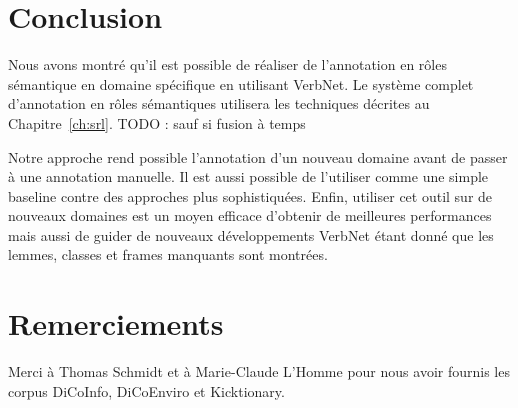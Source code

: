 \section{Conclusion}

Nous avons montré qu'il est possible de réaliser de l'annotation en rôles
sémantique en domaine spécifique en utilisant VerbNet. Le système complet
d'annotation en rôles sémantiques utilisera les techniques décrites au
Chapitre~\ref{ch:srl}. TODO : sauf si fusion à temps

Notre approche rend possible l'annotation d'un nouveau domaine avant de passer
à une annotation manuelle. Il est aussi possible de l'utiliser comme une simple
baseline contre des approches plus sophistiquées. Enfin, utiliser cet outil sur
de nouveaux domaines est un moyen efficace d'obtenir de meilleures performances
mais aussi de guider de nouveaux développements VerbNet étant donné que les
lemmes, classes et frames manquants sont montrées.

\section*{Remerciements}

Merci à Thomas Schmidt et à Marie-Claude L'Homme pour nous avoir fournis les
corpus DiCoInfo, DiCoEnviro et Kicktionary.
